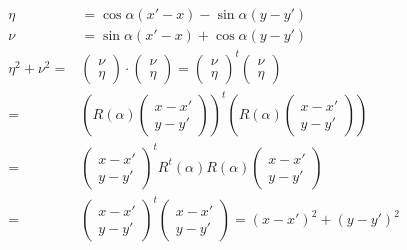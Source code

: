 \documentclass[a4paper,12pt]{article}
\begin{document}
\begin{enumerate}
\begin{align}
  \eta&=\cos\alpha (x'-x)- \sin \alpha (y-y')\\
\nu&=\sin \alpha(x'-x)+\cos \alpha (y-y')\\
\eta^2+\nu^2=&\left(\begin{array}{c}
     \nu \\
      \eta
    \end{array}\right) \cdot \left(\begin{array}{c}
     \nu \\
      \eta
    \end{array}\right)=\left(\begin{array}{c}
     \nu \\
      \eta
    \end{array}\right)^t \left(\begin{array}{c}
     \nu \\
      \eta
    \end{array}\right)\\
=&\left(R(\alpha)\left(\begin{array}{c}
     x-x' \\
     y-y'
    \end{array}\right)\right)^t \left(R(\alpha)\left(\begin{array}{c}
     x-x' \\
     y-y'
    \end{array}\right)\right)\\
=& \left(\begin{array}{c}
     x-x' \\
     y-y'
    \end{array}\right)^t R^t(\alpha)R(\alpha)\left(\begin{array}{c}
     x-x' \\
     y-y'
    \end{array}\right)\\
=&\left(\begin{array}{c}
     x-x' \\
     y-y'
    \end{array}\right)^t \left(\begin{array}{c}
     x-x' \\
     y-y'
    \end{array}\right)=(x-x')^2+(y-y')^2 \label{kesamaanJarak}
\end{align}


\end{enumerate}
\end{document}
